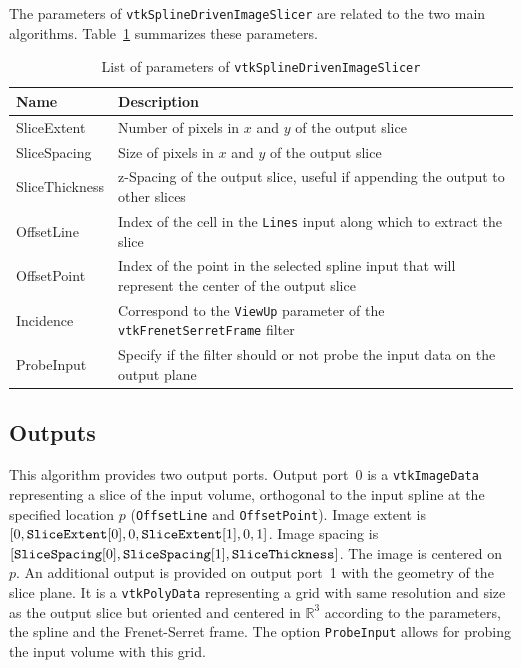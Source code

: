 \documentclass{InsightArticle}
\begin{document}
The parameters of \verb!vtkSplineDrivenImageSlicer! are related to the two main
algorithms. Table~\ref{tab:parameters} summarizes these parameters.
%
\begin{table}
\centering
 \begin{tabular}{lp{10cm}}
Name & Description \\
\hline
SliceExtent & Number of pixels in $x$ and $y$ of the output slice \\
SliceSpacing & Size of pixels in $x$ and $y$ of the output slice \\
SliceThickness & z-Spacing of the output slice, useful if appending the output
to other slices \\
\hline
OffsetLine & Index of the cell in the \verb!Lines! input along which to extract
the slice \\
OffsetPoint & Index of the point in the selected spline input that will
represent the center of the output slice \\
Incidence & Correspond to the \verb!ViewUp! parameter of the
\verb!vtkFrenetSerretFrame! filter \\
\hline
ProbeInput & Specify if the filter should or not probe the input data on the
output plane 
 \end{tabular}
\caption{List of parameters of \texttt{vtkSplineDrivenImageSlicer} }
\label{tab:parameters}
\end{table}
%
\subsection{Outputs}
%
This algorithm provides two output ports. Output port~0 is a 
\verb!vtkImageData! representing a slice of the input volume, orthogonal to the
input spline at the specified location $p$ (\verb!OffsetLine! and 
\verb!OffsetPoint!). Image 
extent is $[0, \verb!SliceExtent![0], 0, \verb!SliceExtent![1], 0, 1]$. 
Image spacing is 
$[\verb!SliceSpacing![0], \verb!SliceSpacing![1], \verb!SliceThickness!]$. The
image is centered on $p$.
An additional output
is provided on output port~1 with the geometry of the slice plane.
It is a \verb!vtkPolyData! representing a grid with same resolution and size as
the output slice but oriented and centered in $\mathbb{R}^3$ according to the 
parameters, the spline and the Frenet-Serret frame. The option 
\verb!ProbeInput! allows for probing the input volume with this grid.
%
\end{document}
